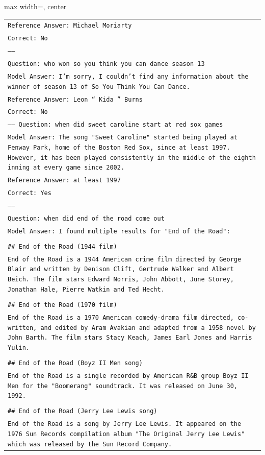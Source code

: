 \documentclass[11pt]{article}
\begin{document}
\begin{table}[ht]
\begin{adjustbox}{max width=\textwidth, center}
\begin{tabular}{>{\raggedright\arraybackslash\tt}p{}<{}}
Reference Answer: Michael Moriarty\\
Correct: No\\
-----\\
Question: who won so you think you can dance season 13\\
Model Answer: I'm sorry, I couldn't find any information about the winner of season 13 of So You Think You Can Dance.\\
Reference Answer: Leon `` Kida '' Burns\\
Correct: No\\
-----
Question: when did sweet caroline start at red sox games\\
Model Answer: The song "Sweet Caroline" started being played at Fenway Park, home of the Boston Red Sox, since at least 1997. However, it has been played consistently in the middle of the eighth inning at every game since 2002.\\
Reference Answer: at least 1997\\
Correct: Yes\\
-----\\
Question: when did end of the road come out\\
Model Answer: I found multiple results for "End of the Road":\\
\\
\#\# End of the Road (1944 film)\\
End of the Road is a 1944 American crime film directed by George Blair and written by Denison Clift, Gertrude Walker and Albert Beich. The film stars Edward Norris, John Abbott, June Storey, Jonathan Hale, Pierre Watkin and Ted Hecht.\\
\\
\#\# End of the Road (1970 film)\\
End of the Road is a 1970 American comedy-drama film directed, co-written, and edited by Aram Avakian and adapted from a 1958 novel by John Barth. The film stars Stacy Keach, James Earl Jones and Harris Yulin.\\
\\
\#\# End of the Road (Boyz II Men song)\\
End of the Road is a single recorded by American R\&B group Boyz II Men for the "Boomerang" soundtrack. It was released on June 30, 1992.\\
\\
\#\# End of the Road (Jerry Lee Lewis song)\\
End of the Road is a song by Jerry Lee Lewis. It appeared on the 1976 Sun Records compilation album "The Original Jerry Lee Lewis" which was released by the Sun Record Company.\\

\end{tabular}
\end{adjustbox}
\end{table}
\end{document}
